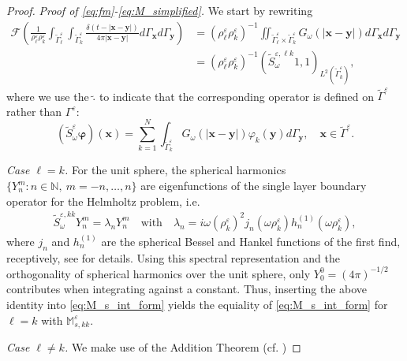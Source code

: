 \documentclass[]{article}
\numberwithin{equation}{section}
\numberwithin{theorem}{section}
\numberwithin{lemma}{section}
\numberwithin{corollary}{section}
\numberwithin{proposition}{section}
\numberwithin{definition}{section}
\newcommand{\mypar}[1]{\noindent\textit{#1}\hspace{0.1em}}
\newcommand{\bx}{\boldsymbol{x}}
\newcommand{\by}{\boldsymbol{y}}
\newcommand{\re}{\varepsilon}
\renewcommand{\vec}{\boldsymbol}
\begin{document}
	\begin{proof}
		\mypar{Proof of \eqref{eq:fm}-\eqref{eq:M_simplified}.}
		We start by rewriting 
		\begin{align}
			\nonumber
			\mathcal{F}\left(\frac{1}{\rho_{\ell}^{\re}\rho_k^{\re}}\int_{\widetilde{\Gamma}_{\ell}^{\re}}\int_{\widetilde{\Gamma}_{k}^{\re}}\frac{\delta(t-|\vec{x}-\vec{y}|)}{4\pi|\vec{x}-\vec{y}|}d\Gamma_{\vec{x}}d\Gamma_{\vec{y}}\right)&= (\rho^{\re}_{\ell} \rho^{\re}_{k})^{-1} \iint_{\tilde{\Gamma}^{\re}_{\ell} \times \tilde{\Gamma}^{\re}_k} G_{\omega} (|\bx - \by|) d\Gamma_{\bx} d\Gamma_{\by} \\
			\label{eq:M_s_int_form}	
			&= (\rho^{\re}_{\ell} \rho^{\re}_{k})^{-1} (\widetilde{S}^{\re, \ell k}_{\omega} 1, 1)_{L^2(\tilde{\Gamma}^{\re}_k)},
		\end{align}
		where we use the $\widetilde{.}$ to indicate that the corresponding operator is defined on $\widetilde{\Gamma}^{\re}$ rather than $\Gamma^{\re}$:   $$(\widetilde{S}^{\re}_{\omega}\vec{\varphi})(\vec{x})=\sum\limits_{k=1}^N\int_{\widetilde{\Gamma}_k^{\re}}G_{\omega}(|\bx-\by|)\varphi_k(\vec{y})d\Gamma_{\by}, \quad \vec{x}\in \widetilde{\Gamma}^{\re}.$$  
		
		\mypar{Case $\ell = k$.}
		For the unit sphere, the spherical harmonics $\{ Y^m_n: n \in \mathbb{N}, ~m = -n,\ldots, n \}$ are eigenfunctions of the single layer boundary operator for the Helmholtz problem, i.e.
		\begin{align*}%
			\widetilde{S}^{\re, kk}_{\omega} Y^m_n = \lambda_n Y^m_n \quad \text{with}\quad \lambda_n = i \omega (\rho^{\re}_k)^2 j_n(\omega \rho^{\re}_k) h^{(1)}_n(\omega \rho^{\re}_k),
		\end{align*} 
		where $j_n$ and $h^{(1)}_n$ are the spherical Bessel and Hankel functions of the first find, receptively, see \cite[p. 437, Section 10]{abramowitz} for details. Using this spectral representation and the orthogonality of spherical harmonics over the unit sphere, only $Y^0_0 = (4\pi)^{-1/2}$ contributes when integrating against a constant. Thus, inserting the above identity into \eqref{eq:M_s_int_form} yields the equiality of \eqref{eq:M_s_int_form} for $\ell=k$ with $\mathbb{M}^{\re}_{s, kk}$.
		
		\mypar{Case $\ell \neq k$.}
		We make use of the Addition Theorem (cf. \cite[\S 10.1, p. 440, Formulas 10.1.45 and 10.1.46]{abramowitz})
		

\end{proof}
\end{document}
